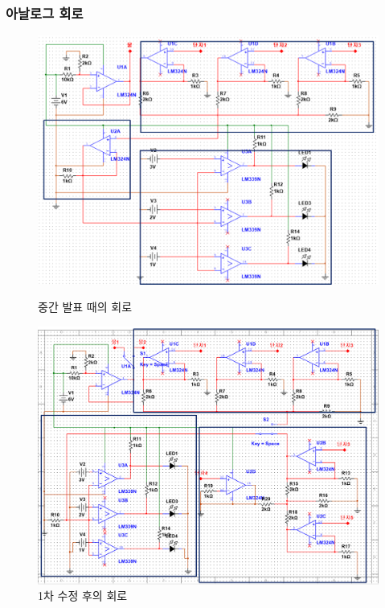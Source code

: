 \documentclass[a4paper,itemph]{oblivoir}
\theoremstyle{definition}
\begin{document}
\subsubsection{아날로그 회로}

\begin{figure}[!htb]
  \includegraphics[width=\linewidth]{1st.png}
  \caption{중간 발표 때의 회로}\label{fig:awesome_image1}
\endminipage\hfill
{}
  \includegraphics[width=\linewidth]{2nd.png}
  \caption{1차 수정 후의 회로}\label{fig:awesome_image2}
\endminipage\hfill
{}

\end{figure}
\end{document}
